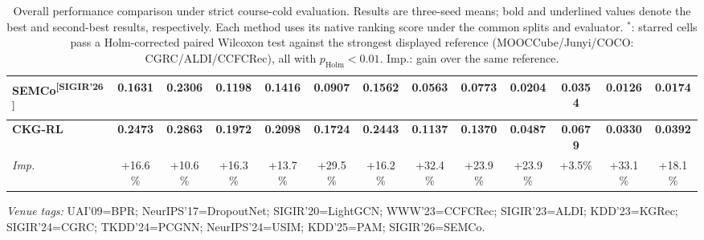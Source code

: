 \documentclass[10pt]{article}
\newcommand{\sigmark}[1]{\rlap{\textsuperscript{\scriptsize #1}}}
\newcommand{\methodref}[1]{\textsuperscript{\scriptsize[#1]}}
\begin{document}
\begin{table}[!ht]
{\begin{tabular}{lcccccccccccc}
SEMCo\methodref{SIGIR'26} & 0.1631 & 0.2306 & 0.1198 & 0.1416 & 0.0907 & 0.1562 & 0.0563 & 0.0773 & 0.0204 & 0.0354 & 0.0126 & 0.0174 \\
\midrule
\textbf{CKG-RL} & \textbf{0.2473}\sigmark{*} & \textbf{0.2863}\sigmark{*} & \textbf{0.1972}\sigmark{*} & \textbf{0.2098}\sigmark{*} & \textbf{0.1724}\sigmark{*} & \textbf{0.2443}\sigmark{*} & \textbf{0.1137}\sigmark{*} & \textbf{0.1370}\sigmark{*} & \textbf{0.0487}\sigmark{*} & \textbf{0.0679} & \textbf{0.0330}\sigmark{*} & \textbf{0.0392}\sigmark{*} \\
\emph{Imp.} & +16.6\% & +10.6\% & +16.3\% & +13.7\% & +29.5\% & +16.2\% & +32.4\% & +23.9\% & +23.9\% & +3.5\% & +33.1\% & +18.1\% \\
\bottomrule
\end{tabular}
}
\caption{Overall performance comparison under strict course-cold evaluation. Results are three-seed means; bold and underlined values denote the best and second-best results, respectively. Each method uses its native ranking score under the common splits and evaluator. \(^{*}\): starred cells pass a Holm-corrected paired Wilcoxon test against the strongest displayed reference (MOOCCube/Junyi/COCO: CGRC/ALDI/CCFCRec), all with \(p_{\mathrm{Holm}}<0.01\). Imp.: gain over the same reference.}
\vspace{0.2em}
\begin{minipage}{\textwidth}
\scriptsize\emph{Venue tags:} UAI'09=BPR; NeurIPS'17=DropoutNet; SIGIR'20=LightGCN; WWW'23=CCFCRec; SIGIR'23=ALDI; KDD'23=KGRec; SIGIR'24=CGRC; TKDD'24=PCGNN; NeurIPS'24=USIM; KDD'25=PAM; SIGIR'26=SEMCo.
\end{minipage}
\end{table}
\end{document}
